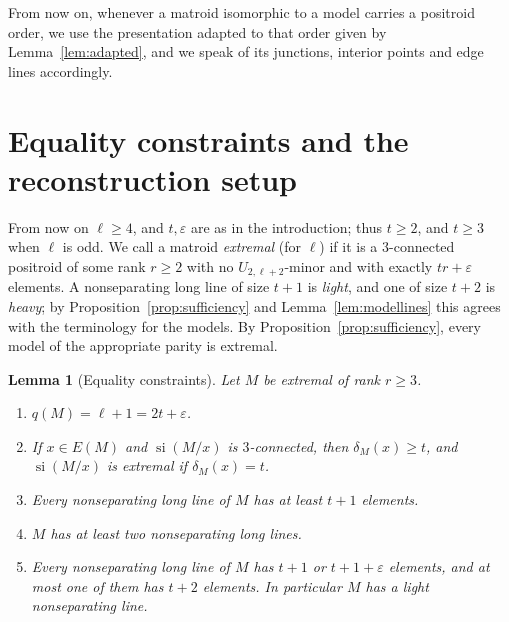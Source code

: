 \documentclass[11pt]{amsart}
\newtheorem{lemma}[theorem]{Lemma}
\theoremstyle{definition}
\theoremstyle{remark}
\numberwithin{equation}{section}
\newcommand{\si}{\operatorname{si}}
\begin{document}
From now on, whenever a matroid isomorphic to a model carries a positroid order, we use the presentation adapted to that order given by Lemma~\ref{lem:adapted}, and we speak of its junctions, interior points and edge lines accordingly.

\section{Equality constraints and the reconstruction setup}\label{sec:equality}

From now on $\ell\ge4$, and $t,\varepsilon$ are as in the introduction; thus $t\ge2$, and $t\ge3$ when $\ell$ is odd. We call a matroid \emph{extremal} (for $\ell$) if it is a $3$-connected positroid of some rank $r\ge2$ with no $U_{2,\ell+2}$-minor and with exactly $tr+\varepsilon$ elements. A nonseparating long line of size $t+1$ is \emph{light}, and one of size $t+2$ is \emph{heavy}; by Proposition~\ref{prop:sufficiency} and Lemma~\ref{lem:modellines} this agrees with the terminology for the models. By Proposition~\ref{prop:sufficiency}, every model of the appropriate parity is extremal.

\begin{lemma}[Equality constraints]\label{lem:equality}
Let $M$ be extremal of rank $r\ge3$.
\begin{enumerate}[label=\textup{(\alph*)}]
\item $q(M)=\ell+1=2t+\varepsilon$.
\item If $x\in E(M)$ and $\si(M/x)$ is $3$-connected, then $\delta_M(x)\ge t$, and $\si(M/x)$ is extremal if $\delta_M(x)=t$.
\item Every nonseparating long line of $M$ has at least $t+1$ elements.
\item $M$ has at least two nonseparating long lines.
\item Every nonseparating long line of $M$ has $t+1$ or $t+1+\varepsilon$ elements, and at most one of them has $t+2$ elements. In particular $M$ has a light nonseparating line.
\end{enumerate}
\end{lemma}
\end{document}
